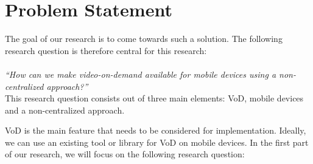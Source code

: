 \section{Problem Statement}
The goal of our research is to come towards such a solution. The following research question is therefore central for this research:\\
\\
\textit{``How can we make video-on-demand available for mobile devices using a non-centralized approach?''}\\

This research question consists out of three main elements: VoD, mobile devices and a non-centralized approach.

VoD is the main feature that needs to be considered for implementation. Ideally, we can use an existing tool or library for VoD on mobile devices. In the first part of our research, we will focus on the following research question:

